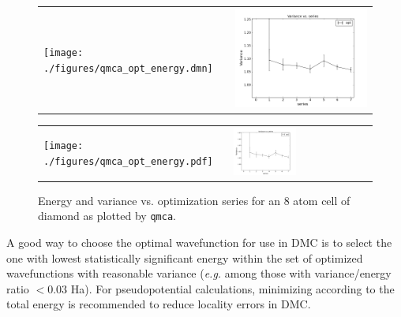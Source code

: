 \begin{figure}
  \centering
  \ifdefined\HCode%
  \begin{tabularx}{1024pt}{X X}
    \texttt{[image: ./figures/qmca\_opt\_energy.dmn]}&
    \includegraphics[trim=2mm 0mm 4mm 0mm,clip,width=512pt]{./figures/qmca_opt_variance.png}\\
  \end{tabularx}
\else%
  \begin{tabularx}{\textwidth}{X X}
    \texttt{[image: ./figures/qmca\_opt\_energy.pdf]}&
    \includegraphics[trim=2mm 0mm 4mm 0mm,clip,width=0.47\textwidth]{./figures/qmca_opt_variance.png}\\
    \end{tabularx}
\fi%
  \caption{Energy and variance vs. optimization series for an 8 atom cell of diamond as plotted by \texttt{qmca}.}%
  \label{fig:qmca_opt_ev}%
\end{figure}

A good way to choose the optimal wavefunction for use in DMC is to select 
the one with lowest statistically significant energy within the set of 
optimized wavefunctions with reasonable variance (\emph{e.g.} among 
those with variance/energy ratio $<0.03$ Ha).  For pseudopotential 
calculations, minimizing according to the total energy is recommended 
to reduce locality errors in DMC.


